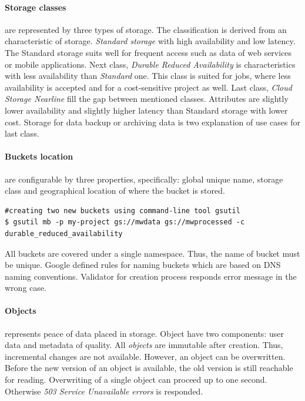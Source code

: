 \documentclass[a4paper,12pt,oneside]{report}
\begin{document}
	
	\paragraph{Storage classes} are represented by three types of storage. The
	classification is derived from an characteristic of storage. \textit{Standard
		storage} with high availability and low 
	latency. The Standard storage suits well for frequent access such 
	as data of web services or mobile applications.
	Next class, \textit{Durable Reduced Availability} is characteristics with less
	availability than  \textit{Standard} one. 
	This class is suited for jobs, where less availability is accepted and for a
	cost-sensitive project as well. 
	Last class, \textit{Cloud Storage Nearline} fill the gap between mentioned
	classes. Attributes are slightly lower availability and slightly higher 
	latency than Standard storage with lower cost. 
	Storage for data backup or archiving data is two explanation of use cases for
	last class.
	
	\paragraph{Buckets location} are configurable by three properties, specifically:
	global unique 
	name, storage class and geographical location of where the bucket is stored.
	\begin{footnotesize}
		\begin{lstlisting}[style=mybash]
#creating two new buckets using command-line tool gsutil
$ gsutil mb -p my-project gs://mwdata gs://mwprocessed -c
durable_reduced_availability
		\end{lstlisting}
	\end{footnotesize}
	All buckets are covered under a single namespace. Thus, the name of bucket must
	be unique. 
	Google defined rules for naming buckets which are based on DNS naming
	conventions. Validator for creation process responds error message in the wrong
	case. 
	
	\paragraph{Objects} represents peace of data placed in storage. Object have two
	components: 
	user data and metadata of quality. All \textit{objects} are immutable after
	creation. Thus, incremental changes are not available. However, an object 
	can be overwritten. Before the new version of an object is available, the old
	version is still 
	reachable for reading. Overwriting of a single object 
	can proceed up to one second. Otherwise \textit{503 Service Unavailable errors}
	is responded.
	
\end{document}
